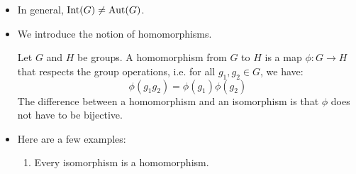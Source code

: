 \begin{itemize}
\begin{proof}
              Let $g_1,g_2 \in G$. Then:
              \begin{align}
                  \Int(a)(g_1g_2) & = a(g_1g_2)a^{-1}          \\
                                  & = ag_1a^{-1}ag_2a^{-1}     \\
                                  & = \Int(a)(g_1)\Int(a)(g_2)
              \end{align}
              Therefore, $\Int(a) \in \aut(G)$. For each $a\in G$, $\Int(a) \in \Int(G)$ by definition. Therefore: $\Int(G) \neq \emptyset$. Let $a,b \in G$. Then we claim that:
              \begin{equation}
                  \Int(a)^{-1} = \Int(a^{-1})
              \end{equation}
              and $\Int(a)\Int(b) = \Int(ab)$. We already proved (1). Let $g\in G$. Then:
              \begin{align}
                  \Int(a)(\Int(b)(g)) & = a(bgb^{-1})a^{-1} \\
                                      & = abgb^{-1}a^{-1}   \\
                                      & = (ab)g(ab)^{-1}    \\
                                      & = \Int(ab)g
              \end{align}
              This proves part (2) of the 2-step subgroup test. By the $2$ step subgroup test, $\Int(G) \le \Aut(G)$.
          \end{proof}
    \item In general, $\operatorname{Int}(G) \neq \operatorname{Aut}(G)$.
    \item We introduce the notion of homomorphisms.
          \begin{definition}
              Let $G$ and $H$ be groups. A homomorphism from $G$ to $H$ is a map $\phi:G\rightarrow H$ that respects the group operations, i.e. for all $g_1,g_2 \in G$, we have:
              \begin{equation}
                  \phi(g_1g_2) = \phi(g_1)\phi(g_2)
              \end{equation}
              The difference between a homomorphism and an isomorphism is that $\phi$ does not have to be bijective.
          \end{definition}
    \item Here are a few examples:
          \begin{enumerate}
              \item Every isomorphism is a homomorphism.

\end{enumerate}
\end{itemize}
